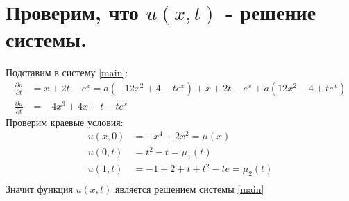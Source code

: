 \documentclass[12pt,a4paper]{scrartcl}
\begin{document}
\section{Проверим, что $u(x,t)$ - решение системы.}
Подставим в систему \eqref{main}:
\begin{align*}
    \frac{\partial u}{\partial t} &= x+ 2 t -e^{x} = a(-12 x^{2} + 4 - t e^{x}) + x+ 2 t - e^{x} + a(12 x^{2} - 4 +t e^{x}) \\
    \frac{\partial u}{\partial t} &= -4 x^{3} +4 x+t-t e^{x} 
\end{align*}
Проверим краевые условия:
\begin{align*}
    u(x,0) &= - x^{4}+2 x^{2} = \mu(x) \\
    u(0,t) &= t^{2}-t = \mu_1(t) \\
    u(1,t) &= -1+2+t+t^{2}-t e = \mu_2(t) \\
\end{align*}
Значит функция $u(x,t)$ является решением системы \eqref{main}
\end{document}
